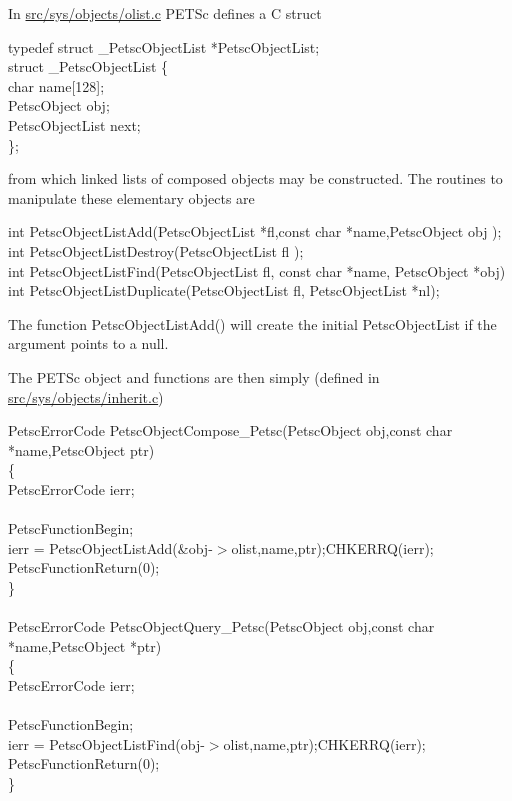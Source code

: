 \documentclass[twoside,12pt]{../sty/report_petsc}
\begin{document}
In \href{http://www.mcs.anl.gov/petsc/petsc-dev/src/objects/olist.c.html}{src/sys/objects/olist.c} PETSc defines a C struct
\begin{tabbing}
typedef struct \_PetscObjectList *PetscObjectList;\\
struct \_PetscObjectList \{\\
    char             name[128];\\
    PetscObject      obj;\\
    PetscObjectList  next;\\
\};
\end{tabbing}
from which linked lists of composed objects may be constructed. The routines
to manipulate these elementary objects are
\begin{tabbing}
  int PetscObjectListAdd(PetscObjectList *fl,const char *name,PetscObject obj );\\
  int PetscObjectListDestroy(PetscObjectList fl );\\
  int PetscObjectListFind(PetscObjectList fl, const char *name, PetscObject *obj)\\
  int PetscObjectListDuplicate(PetscObjectList fl, PetscObjectList *nl);
\end{tabbing}
The function PetscObjectListAdd() will create the initial PetscObjectList if the argument
 points to a null.

The PETSc object  and  functions are then simply
(defined in \href{http://www.mcs.anl.gov/petsc/petsc-dev/src/objects/inherit.c.html}{src/sys/objects/inherit.c})
\begin{tabbing}
  PetscErrorCode PetscObjectCompose\_Petsc(PetscObject obj,const char *name,PetscObject ptr)\\
  \{\\
    PetscErrorCode ierr;\\
\\
    PetscFunctionBegin;\\
    ierr = PetscObjectListAdd(\&obj-$>$olist,name,ptr);CHKERRQ(ierr);\\
    PetscFunctionReturn(0);\\
  \}\\
\\
  PetscErrorCode PetscObjectQuery\_Petsc(PetscObject obj,const char *name,PetscObject *ptr)\\
  \{\\
    PetscErrorCode ierr;\\
\\
    PetscFunctionBegin;\\
    ierr = PetscObjectListFind(obj-$>$olist,name,ptr);CHKERRQ(ierr);\\
    PetscFunctionReturn(0); \\
  \}
\end{tabbing}
\end{document}
